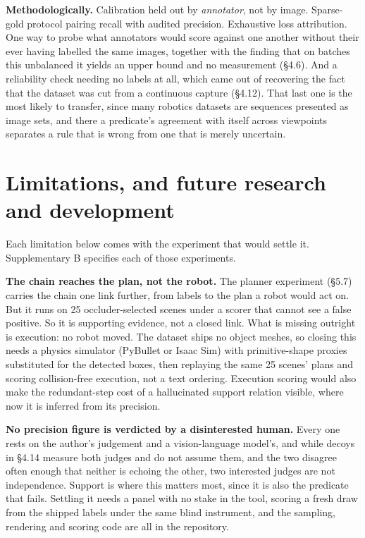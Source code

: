 \textbf{Methodologically.} Calibration held out by \textit{annotator}, not by image. Sparse-gold protocol pairing recall with audited precision. Exhaustive loss attribution. One way to probe what annotators would score against one another without their ever having labelled the same images, together with the finding that on batches this unbalanced it yields an upper bound and no measurement (\S{}4.6). And a reliability check needing no labels at all, which came out of recovering the fact that the dataset was cut from a continuous capture (\S{}4.12). That last one is the most likely to transfer, since many robotics datasets are sequences presented as image sets, and there a predicate's agreement with itself across viewpoints separates a rule that is wrong from one that is merely uncertain.

\section{Limitations, and future research and development}

Each limitation below comes with the experiment that would settle it. Supplementary B specifies each of those experiments.

\textbf{The chain reaches the plan, not the robot.} The planner experiment (\S{}5.7) carries the chain one link further, from labels to the plan a robot would act on. But it runs on 25 occluder-selected scenes under a scorer that cannot see a false positive. So it is supporting evidence, not a closed link. What is missing outright is execution: no robot moved. The dataset ships no object meshes, so closing this needs a physics simulator (PyBullet or Isaac Sim) with primitive-shape proxies substituted for the detected boxes, then replaying the same 25 scenes' plans and scoring collision-free execution, not a text ordering. Execution scoring would also make the redundant-step cost of a hallucinated support relation visible, where now it is inferred from its precision.

\textbf{No precision figure is verdicted by a disinterested human.} Every one rests on the author's judgement and a vision-language model's, and while decoys in \S{}4.14 measure both judges and do not assume them, and the two disagree often enough that neither is echoing the other, two interested judges are not independence. Support is where this matters most, since it is also the predicate that fails. Settling it needs a panel with no stake in the tool, scoring a fresh draw from the shipped labels under the same blind instrument, and the sampling, rendering and scoring code are all in the repository.

